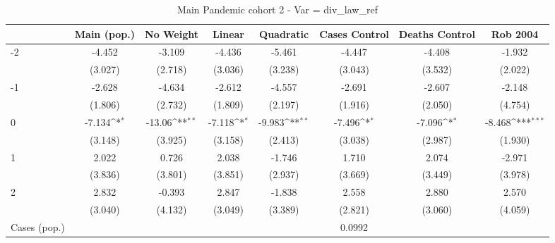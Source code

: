 \documentclass{article}
\begin{document}
{
\def\sym#1{\ifmmode^{#1}\else\(^{#1}\)\fi}
\begin{longtable}{l*{7}{c}}
\caption{Main Pandemic cohort 2 - Var = div\_law\_ref}\\
\hline\hline\endfirsthead\hline\endhead\hline\endfoot\endlastfoot
                &\multicolumn{1}{c}{Main (pop.)}&\multicolumn{1}{c}{No Weight}&\multicolumn{1}{c}{Linear}&\multicolumn{1}{c}{Quadratic}&\multicolumn{1}{c}{Cases Control}&\multicolumn{1}{c}{Deaths Control}&\multicolumn{1}{c}{Rob 2004}\\
\hline
-2              &   -4.452         &   -3.109         &   -4.436         &   -5.461         &   -4.447         &   -4.408         &   -1.932         \\
                &  (3.027)         &  (2.718)         &  (3.036)         &  (3.238)         &  (3.043)         &  (3.532)         &  (2.022)         \\
-1              &   -2.628         &   -4.634         &   -2.612         &   -4.557         &   -2.691         &   -2.607         &   -2.148         \\
                &  (1.806)         &  (2.732)         &  (1.809)         &  (2.197)         &  (1.916)         &  (2.050)         &  (4.754)         \\
0               &   -7.134\sym{*}  &   -13.06\sym{**} &   -7.118\sym{*}  &   -9.983\sym{**} &   -7.496\sym{*}  &   -7.096\sym{*}  &   -8.468\sym{***}\\
                &  (3.148)         &  (3.925)         &  (3.158)         &  (2.413)         &  (3.038)         &  (2.987)         &  (1.930)         \\
1               &    2.022         &    0.726         &    2.038         &   -1.746         &    1.710         &    2.074         &   -2.971         \\
                &  (3.836)         &  (3.801)         &  (3.851)         &  (2.937)         &  (3.669)         &  (3.449)         &  (3.978)         \\
2               &    2.832         &   -0.393         &    2.847         &   -1.838         &    2.558         &    2.880         &    2.570         \\
                &  (3.040)         &  (4.132)         &  (3.049)         &  (3.389)         &  (2.821)         &  (3.060)         &  (4.059)         \\
Cases (pop.)    &                  &                  &                  &                  &   0.0992         &                  &                  \\

\end{longtable}}
\end{document}
